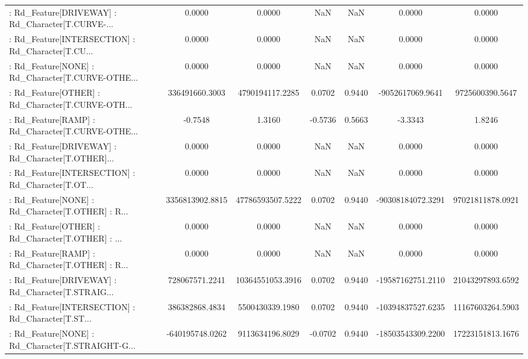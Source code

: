 \begin{longtable}{p{4cm}cccccc}
 : Rd\_Feature[DRIVEWAY] : Rd\_Character[T.CURVE-... &            0.0000 &            0.0000 &     NaN &          NaN &             0.0000 &            0.0000 \\
 : Rd\_Feature[INTERSECTION] : Rd\_Character[T.CU... &            0.0000 &            0.0000 &     NaN &          NaN &             0.0000 &            0.0000 \\
 : Rd\_Feature[NONE] : Rd\_Character[T.CURVE-OTHE... &            0.0000 &            0.0000 &     NaN &          NaN &             0.0000 &            0.0000 \\
 : Rd\_Feature[OTHER] : Rd\_Character[T.CURVE-OTH... &    336491660.3003 &   4790194117.2285 &  0.0702 &       0.9440 &   -9052617069.9641 &   9725600390.5647 \\
 : Rd\_Feature[RAMP] : Rd\_Character[T.CURVE-OTHE... &           -0.7548 &            1.3160 & -0.5736 &       0.5663 &            -3.3343 &            1.8246 \\
 : Rd\_Feature[DRIVEWAY] : Rd\_Character[T.OTHER]... &            0.0000 &            0.0000 &     NaN &          NaN &             0.0000 &            0.0000 \\
 : Rd\_Feature[INTERSECTION] : Rd\_Character[T.OT... &            0.0000 &            0.0000 &     NaN &          NaN &             0.0000 &            0.0000 \\
 : Rd\_Feature[NONE] : Rd\_Character[T.OTHER] : R... &   3356813902.8815 &  47786593507.5222 &  0.0702 &       0.9440 &  -90308184072.3291 &  97021811878.0921 \\
 : Rd\_Feature[OTHER] : Rd\_Character[T.OTHER] : ... &            0.0000 &            0.0000 &     NaN &          NaN &             0.0000 &            0.0000 \\
 : Rd\_Feature[RAMP] : Rd\_Character[T.OTHER] : R... &            0.0000 &            0.0000 &     NaN &          NaN &             0.0000 &            0.0000 \\
 : Rd\_Feature[DRIVEWAY] : Rd\_Character[T.STRAIG... &    728067571.2241 &  10364551053.3916 &  0.0702 &       0.9440 &  -19587162751.2110 &  21043297893.6592 \\
 : Rd\_Feature[INTERSECTION] : Rd\_Character[T.ST... &    386382868.4834 &   5500430339.1980 &  0.0702 &       0.9440 &  -10394837527.6235 &  11167603264.5903 \\
 : Rd\_Feature[NONE] : Rd\_Character[T.STRAIGHT-G... &   -640195748.0262 &   9113634196.8029 & -0.0702 &       0.9440 &  -18503543309.2200 &  17223151813.1676 \\

\end{longtable}

